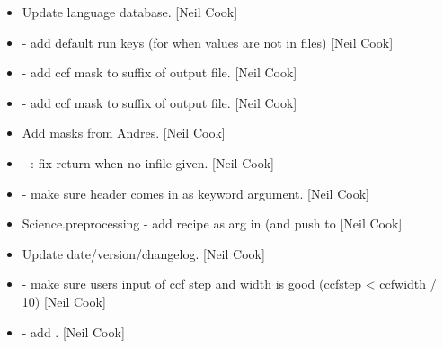 \documentclass[a4paper,10pt,english]{report}
\begin{document}
\begin{itemize}
\item {} 
Update language database. {[}Neil Cook{]}

\item {} 
 - add default run keys (for when
values are not in files) {[}Neil Cook{]}

\item {} 
 - add ccf mask to suffix of output file.
{[}Neil Cook{]}

\item {} 
 - add ccf mask to suffix of output file.
{[}Neil Cook{]}

\item {} 
Add masks from Andres. {[}Neil Cook{]}

\item {} 
 - : fix return when
no infile given. {[}Neil Cook{]}

\item {} 
 -  make sure header
comes in as keyword argument. {[}Neil Cook{]}

\item {} 
Science.preprocessing - add recipe as arg in  (and push to
 {[}Neil Cook{]}

\item {} 
Update date/version/changelog. {[}Neil Cook{]}

\item {} 
 - make sure users input of ccf step and
width is good (ccfstep \textless{} ccfwidth / 10) {[}Neil Cook{]}

\item {} 
 - add
. {[}Neil Cook{]}

\end{itemize}
\end{document}
